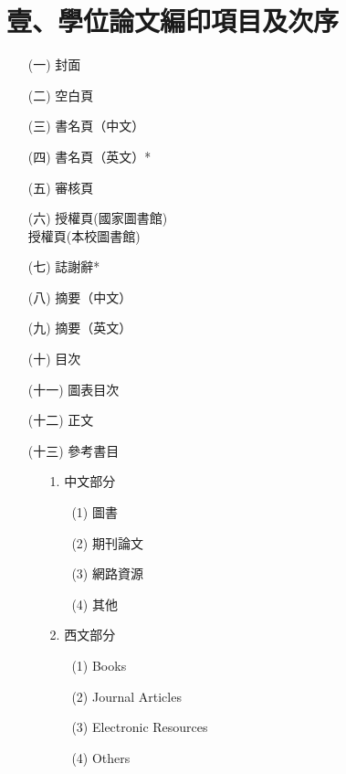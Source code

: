 \chapter{壹、學位論文編印項目及次序}
    \begin{enumerate}
        \item[(一)] 封面
        \item[(二)] 空白頁
        \item[(三)] 書名頁（中文）
        \item[(四)] 書名頁（英文）*
        \item[(五)] 審核頁
        \item[(六)] 授權頁(國家圖書館)\\
                    授權頁(本校圖書館)
        \item[(七)] 誌謝辭*
        \item[(八)] 摘要（中文）
        \item[(九)] 摘要（英文）
        \item[(十)] 目次
        \item[(十一)] 圖表目次
        \item[(十二)] 正文
        \item[(十三)]  參考書目
        \begin{enumerate}
            \item[1.] 中文部分
            \begin{enumerate}
                \item[(1)] 圖書
                \item[(2)] 期刊論文
                \item[(3)] 網路資源
                \item[(4)] 其他
            \end{enumerate}
            \item[2.] 西文部分
            \begin{enumerate}
                \item[(1)] Books
                \item[(2)] Journal Articles
                \item[(3)] Electronic Resources
                \item[(4)] Others
            \end{enumerate}
        \end{enumerate}
    \end{enumerate}
